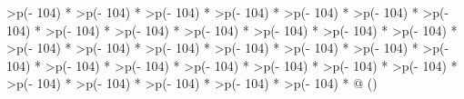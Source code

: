\documentclass[
]{article}
\begin{document}
\begin{longtable}[]
{  >{\raggedleft\arraybackslash}p{(\columnwidth - 104\tabcolsep) * }
  >{\raggedleft\arraybackslash}p{(\columnwidth - 104\tabcolsep) * }
  >{\raggedleft\arraybackslash}p{(\columnwidth - 104\tabcolsep) * }
  >{\raggedleft\arraybackslash}p{(\columnwidth - 104\tabcolsep) * }
  >{\raggedleft\arraybackslash}p{(\columnwidth - 104\tabcolsep) * }
  >{\raggedleft\arraybackslash}p{(\columnwidth - 104\tabcolsep) * }
  >{\raggedleft\arraybackslash}p{(\columnwidth - 104\tabcolsep) * }
  >{\raggedleft\arraybackslash}p{(\columnwidth - 104\tabcolsep) * }
  >{\raggedleft\arraybackslash}p{(\columnwidth - 104\tabcolsep) * }
  >{\raggedleft\arraybackslash}p{(\columnwidth - 104\tabcolsep) * }
  >{\raggedleft\arraybackslash}p{(\columnwidth - 104\tabcolsep) * }
  >{\raggedleft\arraybackslash}p{(\columnwidth - 104\tabcolsep) * }
  >{\raggedleft\arraybackslash}p{(\columnwidth - 104\tabcolsep) * }
  >{\raggedleft\arraybackslash}p{(\columnwidth - 104\tabcolsep) * }
  >{\raggedleft\arraybackslash}p{(\columnwidth - 104\tabcolsep) * }
  >{\raggedleft\arraybackslash}p{(\columnwidth - 104\tabcolsep) * }
  >{\raggedleft\arraybackslash}p{(\columnwidth - 104\tabcolsep) * }
  >{\raggedleft\arraybackslash}p{(\columnwidth - 104\tabcolsep) * }
  >{\raggedleft\arraybackslash}p{(\columnwidth - 104\tabcolsep) * }
  >{\raggedleft\arraybackslash}p{(\columnwidth - 104\tabcolsep) * }
  >{\raggedleft\arraybackslash}p{(\columnwidth - 104\tabcolsep) * }
  >{\raggedleft\arraybackslash}p{(\columnwidth - 104\tabcolsep) * }
  >{\raggedleft\arraybackslash}p{(\columnwidth - 104\tabcolsep) * }
  >{\raggedleft\arraybackslash}p{(\columnwidth - 104\tabcolsep) * }
  >{\raggedleft\arraybackslash}p{(\columnwidth - 104\tabcolsep) * }
  >{\raggedleft\arraybackslash}p{(\columnwidth - 104\tabcolsep) * }
  >{\raggedleft\arraybackslash}p{(\columnwidth - 104\tabcolsep) * }
  >{\raggedleft\arraybackslash}p{(\columnwidth - 104\tabcolsep) * }
  >{\raggedleft\arraybackslash}p{(\columnwidth - 104\tabcolsep) * }
  >{\raggedleft\arraybackslash}p{(\columnwidth - 104\tabcolsep) * }
  >{\raggedleft\arraybackslash}p{(\columnwidth - 104\tabcolsep) * }@{}}
\toprule()
\begin{minipage}[b]{\linewidth}\raggedleft

\end{minipage}
\end{longtable}
\end{document}

